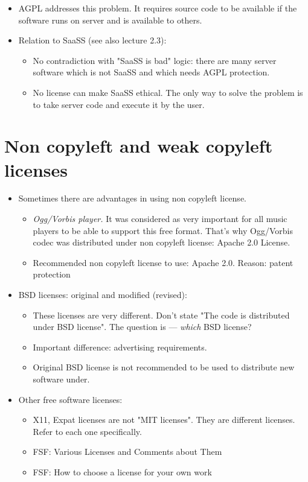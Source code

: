 \documentclass[twoside,openright]{report}
\begin{document}
\begin{itemize}
\begin{itemize}
 \item         AGPL addresses this problem. It requires source code to be available if the software runs on server and is available to others.
 \item         Relation to SaaSS (see also lecture 2.3):
\begin{itemize}
 \item             No contradiction with "SaaSS is bad" logic: there are many server software which is not SaaSS and which needs AGPL protection.
 \item             No license can make SaaSS ethical. The only way to solve the problem is to take server code and execute it by the user.
\end{itemize}
\end{itemize}
\end{itemize}


\section{Non copyleft and weak copyleft licenses}
\begin{itemize}
 \item    Sometimes there are advantages in using non copyleft license.
\begin{itemize}
 \item        \emph{Ogg/Vorbis player.} It was considered as very important for all music players to be able to support this free format. That's why Ogg/Vorbis codec was distributed under non copyleft license: Apache 2.0 License.
 \item        Recommended non copyleft license to use: Apache 2.0. Reason: patent protection
\end{itemize}
 \item    BSD licenses: original and modified (revised):
\begin{itemize}
 \item        These licenses are very different. Don't state "The code is distributed under BSD license". The question is --- \emph{which} BSD license?
 \item        Important difference: advertising requirements.
 \item        Original BSD license is not recommended to be used to distribute new software under.
\end{itemize}
 \item    Other free software licenses:
\begin{itemize}
 \item        X11, Expat licenses are not "MIT licenses". They are different licenses. Refer to each one specifically.
 \item        FSF: Various Licenses and Comments about Them
 \item        FSF: How to choose a license for your own work
\end{itemize}
\end{itemize}
\end{document}
